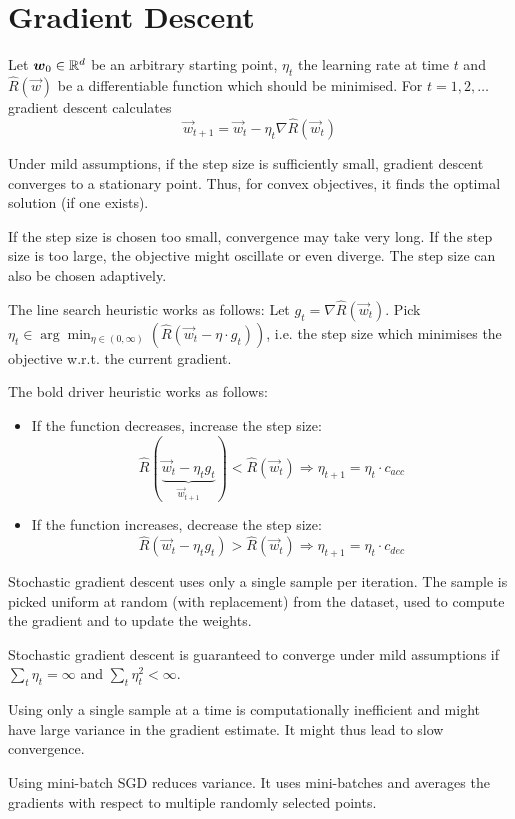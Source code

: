 \section{Gradient Descent}
Let $\boldsymbol{w}_0 \in \mathbb{R}^d$ be an arbitrary
starting point,
$\eta_t$ the learning rate at time $t$ and
$\hat{R}(\vec{w})$ be a differentiable function
which should be minimised.
For $t = 1, 2, \dotsc$ gradient descent calculates
\begin{equation*}
    \vec{w}_{t + 1} = \vec{w}_t - \eta_t
    \nabla \hat{R}(\vec{w}_t)
\end{equation*}

Under mild assumptions, if the step size is sufficiently
small, gradient descent converges to a stationary
point.
Thus, for convex objectives, it finds the optimal solution (if one exists).

If the step size is chosen too small, convergence may
take very long.
If the step size is too large, the objective might
oscillate or even diverge.
The step size can also be chosen adaptively.

The line search heuristic works as follows:
Let $g_t = \nabla \hat{R}(\vec{w}_t)$.
Pick $\eta_t \in \arg\min_{\eta \in (0, \infty)}(
    \hat{R}(\vec{w}_t - \eta \cdot g_t)
)$,
i.e. the step size which minimises the objective
w.r.t. the current gradient.

The bold driver heuristic works as follows:
\begin{itemize}
    \item If the function decreases, increase the step size:
    \begin{equation*}
        \hat{R}(\underbrace{\vec{w}_t - \eta_t g_t}_{\vec{w}_{t+1}}) < \hat{R}(\vec{w}_t)
        \Rightarrow \eta_{t + 1} = \eta_t \cdot c_{acc}
    \end{equation*}
    \item If the function increases, decrease the step size:
    \begin{equation*}
        \hat{R}(\vec{w}_t - \eta_t g_t) > \hat{R}(\vec{w}_t)
        \Rightarrow \eta_{t + 1} = \eta_t \cdot c_{dec}
    \end{equation*}
\end{itemize}

Stochastic gradient descent uses only a single
sample per iteration.
The sample is picked uniform at random
(with replacement) from the dataset,
used to compute the gradient and to update the
weights.

Stochastic gradient descent is guaranteed to
converge under mild assumptions if
$\sum_t{\eta_t} = \infty$ and
$\sum_t{\eta_t^2} < \infty$.

Using only a single sample at a time is computationally inefficient
and might have large variance in the gradient estimate.
It might thus lead to slow convergence.

Using mini-batch SGD reduces variance.
It uses mini-batches and averages the gradients with respect to
multiple randomly selected points.
